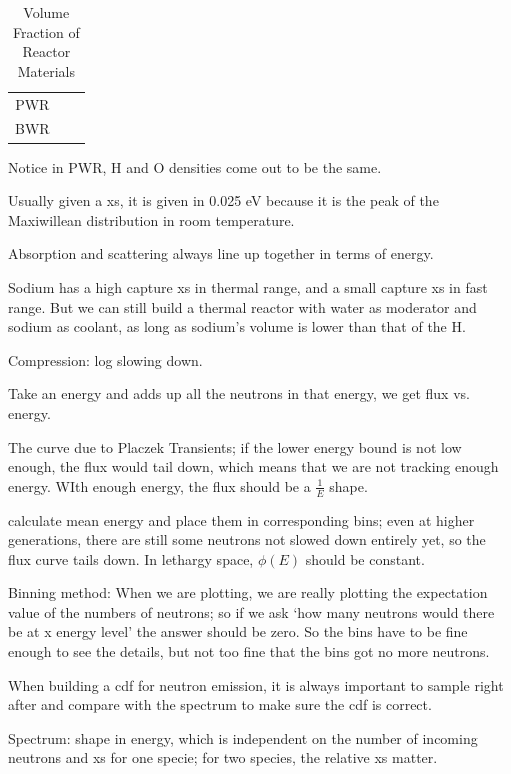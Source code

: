 \documentclass{school-22.211-notes}
\begin{document}
\begin{table}
  \centering
  \begin{tabular}{|c|c|c|}
    PWR & & \\
    BWR & & 
  \end{tabular}
  \caption{Volume Fraction of Reactor Materials}
\end{table}
Notice in PWR, H and O densities come out to be the same. 

Usually given a xs, it is given in 0.025 eV because it is the peak of the Maxiwillean distribution in room temperature. 

Absorption and scattering always line up together in terms of energy. 

Sodium has a high capture xs in thermal range, and a small capture xs in fast range. But we can still build a thermal reactor with water as moderator and sodium as coolant, as long as sodium's volume is lower than that of the H. 

Compression: log slowing down. 

Take an energy and adds up all the neutrons in that energy, we get flux vs. energy. 

The curve due to Placzek Transients; if the lower energy bound is not low enough, the flux would tail down, which means that we are not tracking enough energy. WIth enough energy, the flux should be a $\frac{1}{E}$ shape. 

 calculate mean energy and place them in corresponding bins; even at higher generations, there are still some neutrons not slowed down entirely yet, so the flux curve tails down. In lethargy space, $\phi(E)$ should be constant. 

Binning method: When we are plotting, we are really plotting the expectation value of the numbers of neutrons; so if we ask `how many neutrons would there be at x energy level' the answer should be zero. So the bins have to be fine enough to see the details, but not too fine that the bins got no more neutrons. 


When building a cdf for neutron emission, it is always important to sample right after and compare with the spectrum to make sure the cdf is correct. 

Spectrum: shape in energy, which is independent on the number of incoming neutrons and xs for one specie; for two species, the relative xs matter. 
\end{document}
